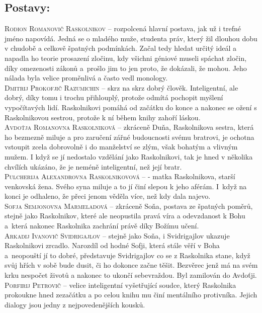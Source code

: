 \documentclass{extarticle} %
\begin{document}
\subsection*{Postavy:}
\noindent 
\textsc{Rodion Romanovič Raskolnikov --} rozpolcená hlavní postava, jak už i trefné jméno napovídá. Jedná se o mladého muže, studenta práv, který žil dlouhou dobu v chudobě a celkově špatných podmínkách. Začal tedy hledat určitý ideál a napadla ho teorie prosazení zločinu, kdy všichni géniové museli spáchat zločin, díky omezenosti zákonů a~prošlo jim to jen proto, že dokázali, že mohou. Jeho nálada byla velice proměnlivá a často vedl monology. \\
\textsc{Dmitrij Prokofjič Razumichin --} skrz na skrz dobrý člověk. Inteligentní, ale dobrý, díky tomu i trochu přihlouplý, protože odmítá pochopit myšlení vypočítavých lidí. Raskolnikovi pomáhá od začátku do konce a nakonec se ožení s Raskolnikovou sestrou, protože k ní během knihy zahoří láskou. \\
\textsc{Avdoťja Romanovna Raskolniková --} zkráceně Duňa, Raskolnikova sestra, která ho bezmezně miluje a pro zaručení zářné budoucnosti svému bratrovi, je ochotna vstoupit zcela dobrovolně i do manželství se zlým, však bohatým a vlivným mužem. I když se jí nedostalo vzdělání jako Raskolnikovi, tak je hned v několika chvílích ukázáno, že je neméně inteligentní, než její bratr. \\
\textsc{Pulcherija Alexandrovna Raskolnikovová --} - matka Raskolnikova, starší venkovská žena. Svého syna miluje a to jí činí slepou k jeho aférám. I~když na konci je odhaleno, že přeci jenom věděla více, než kdy dala najevo. \\
\textsc{Sofja Semjonovna Marmeladová --} zkráceně Soňa, postava ze špatných poměrů, stejně jako Raskolnikov, které ale neopustila pravá víra a odevzdanost k Bohu a~která nakonec Raskolnika zachrání právě díky Božímu učení. \\
\textsc{Arkadij Ivanovič Svidrigajlov --} stejně jako Soňa, i Svidrigajlov ukazuje Raskolnikovi zrcadlo. Narozdíl od hodné Sofji, která stále věří v Boha a~neopouští jí to dobré, představuje Svidrigajlov co se z Raskolnika stane, když svůj hřích v sobě bude dusit, či ho dokonce začne těšit. Bezvěrec jenž má na svém krku nespočet životů a nakonec to ukončí sebevraždou. Byl zamilován do Avdoťji. \\
\textsc{Porfirij Petrovič --} velice inteligentní vyšetřující soudce, který Raskolnika prokoukne hned zezačátku a po celou knihu mu činí mentálního protivníka. Jejich dialogy jsou jedny z nejpovedenějších kousků.
\end{document}

